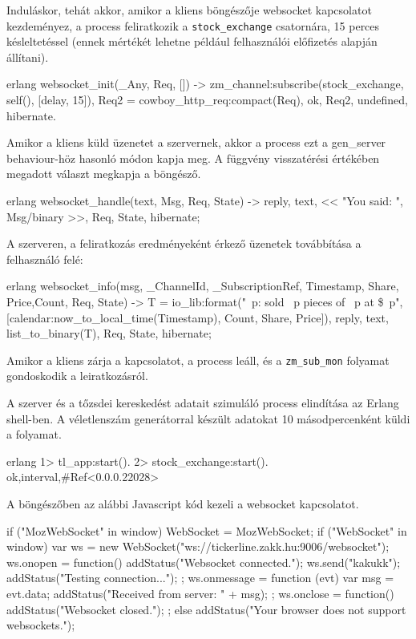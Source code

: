 \documentclass[12pt, a4paper, oneside]{book}
\begin{document}
Induláskor, tehát akkor, amikor a kliens böngészője websocket kapcsolatot
kezdeményez, a process feliratkozik a \texttt{stock\_exchange} csatornára, 15
perces késleltetéssel (ennek mértékét lehetne például felhasználói előfizetés
alapján állítani).

\begin{code}{erlang}{}
websocket_init(_Any, Req, []) ->
  zm_channel:subscribe(stock_exchange, self(), [{delay, 15}]),
  Req2 = cowboy_http_req:compact(Req),
  {ok, Req2, undefined, hibernate}.
\end{code}

Amikor a kliens küld üzenetet a szervernek, akkor a process ezt a gen\_server
behaviour-höz hasonló módon kapja meg. A függvény visszatérési értékében
megadott választ megkapja a böngésző.

\begin{code}{erlang}{}
websocket_handle({text, Msg}, Req, State) ->
  {reply, {text, << "You said: ", Msg/binary >>}, 
           Req, State, hibernate};
\end{code}

A szerveren, a feliratkozás eredményeként érkező üzenetek továbbítása a
felhasználó felé:

\begin{code}{erlang}{}
websocket_info({msg, {_ChannelId, _SubscriptionRef}, 
               {Timestamp, {Share, Price,Count}}}, 
                Req, State) ->
  T = io_lib:format("~p: sold ~p pieces of ~p at \$~p",
                [calendar:now_to_local_time(Timestamp), 
                Count, Share, Price]),
  {reply, {text, list_to_binary(T)}, Req, State, hibernate};
\end{code}

Amikor a kliens zárja a kapcsolatot, a process leáll, és a
\texttt{zm\_sub\_mon} folyamat gondoskodik a leiratkozásról.

A szerver és a tőzsdei kereskedést adatait szimuláló process elindítása az
Erlang shell-ben. A véletlenszám generátorral készült adatokat 10
másodpercenként küldi a folyamat.

\begin{code}{erlang}{}
1> tl_app:start().
2> stock_exchange:start().
{ok,{interval,#Ref<0.0.0.22028>}}
\end{code}

A böngészőben az alábbi Javascript kód kezeli a websocket kapcsolatot.

\begin{code}{}{}
  if ("MozWebSocket" in window) {
    WebSocket = MozWebSocket;
  }
  if ("WebSocket" in window) {
    var ws = 
      new WebSocket("ws://tickerline.zakk.hu:9006/websocket");
    ws.onopen = function() {
      addStatus("Websocket connected.");
      ws.send("kakukk");
      addStatus("Testing connection...");
    };
    ws.onmessage = function (evt) {
      var msg = evt.data;
      addStatus("Received from server: " + msg);
    };
    ws.onclose = function() {
      addStatus("Websocket closed.");
    };
  } else {
    addStatus("Your browser does not support websockets.");
  }
\end{code}
\end{document}
